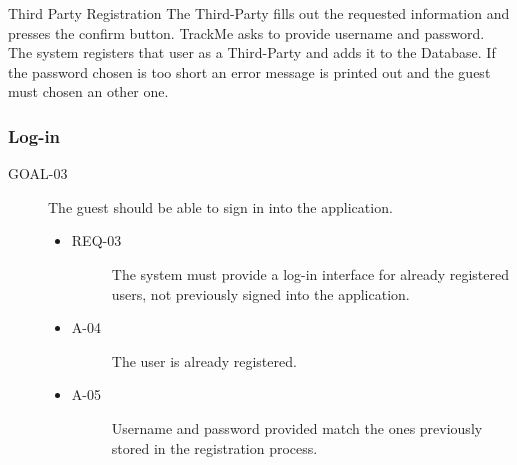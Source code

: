 \documentclass[a4paper]{article}
\newcommand{\requirement}{\ding{229}}%
\begin{document}
        
        \begin{usecase}{Third Party Registration}
              {The Third-Party fills out the requested information and presses the confirm button.}
               {TrackMe asks to provide username and password.}
              {The system registers that user as a Third-Party and adds it to the  Database.}
        {If the password chosen is too short an error message is printed out and the guest must chosen an other one.}
      \end{usecase}
        
        
        \subsubsection{Log-in}
        
        
        \begin{description}
        	\item[GOAL-03] The guest should be able to sign in into the application.
            	\begin{itemize}
            	    \item[\requirement]
                	\begin{description}
                	\item[REQ-03] The system must provide a log-in interface for already registered users, not previously signed into the application.
                	\end{description}
                	\item
                	\begin{description}
                	\item[A-04] The user is already registered.
                	\end{description}
                	\item
                	\begin{description}
                	\item[A-05] Username and password provided match the ones previously stored in the registration process.
                	\end{description}
                	\end{itemize}
        \end{description}
        
\end{document}
